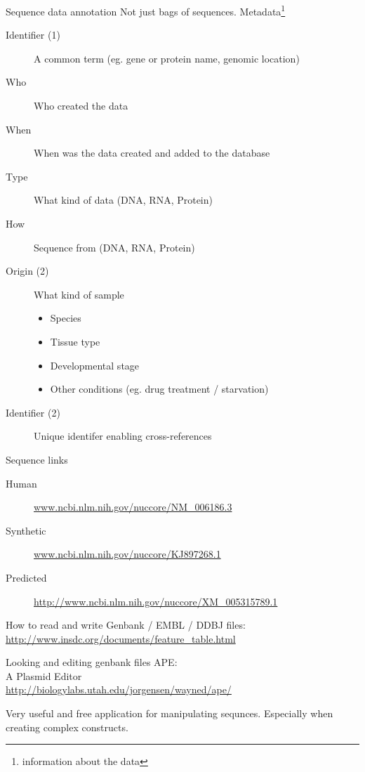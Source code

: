 \documentclass[pdf]{beamer}
\begin{document}
\begin{frame}{Sequence data annotation}
  Not just bags of sequences.
  \pause
  Metadata\footnote{information about the data}
  \pause
  \vspace{-2ex}
  \small
  \begin{description}
  \item[Identifier (1)] A common term (eg. gene or protein name, genomic location)
  \item[Who] Who created the data
  \item[When] When was the data created and added to the database
  \item[Type] What kind of data (DNA, RNA, Protein)
  \item[How] Sequence from (DNA, RNA, Protein)
  \item[Origin (2)] What kind of sample
    \begin{itemize}
    \item Species
    \item Tissue type
    \item Developmental stage
    \item Other conditions (eg. drug treatment / starvation)
    \end{itemize}
  \item[Identifier (2)] Unique identifer enabling cross-references
  \end{description}
  
\end{frame}

\begin{frame}{Sequence links}
  {\small
  \begin{description}
    \item[Human] \href{http://www.ncbi.nlm.nih.gov/nuccore/NM_006186.3}{www.ncbi.nlm.nih.gov/nuccore/NM\_006186.3}
    \item[Synthetic] \href{http://www.ncbi.nlm.nih.gov/nuccore/KJ897268.1}{www.ncbi.nlm.nih.gov/nuccore/KJ897268.1}
    \item[Predicted] \href{http://www.ncbi.nlm.nih.gov/nuccore/XM_005315789.1}{http://www.ncbi.nlm.nih.gov/nuccore/XM\_005315789.1}
  \end{description}
  }
  
  How to read and write Genbank / EMBL / DDBJ files:\\
  \url{http://www.insdc.org/documents/feature_table.html}
\end{frame}


\begin{frame}{Looking and editing genbank files}
  APE:\\
  A Plasmid Editor\\
  \url{http://biologylabs.utah.edu/jorgensen/wayned/ape/}

  Very useful and free application for manipulating sequnces.
  Especially when creating complex constructs.
\end{frame}
\end{document}
